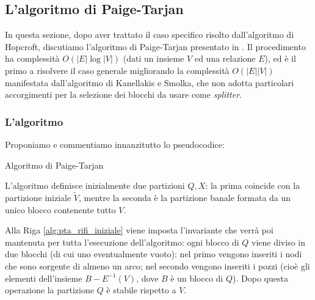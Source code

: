 \subsection{L'algoritmo di Paige-Tarjan}
In questa sezione, dopo aver trattato il caso specifico risolto dall'algoritmo di Hopcroft, discutiamo l'algoritmo di Paige-Tarjan presentato in \cite{paigetarjan}. Il procedimento ha complessità $O(|E|\log |V|)$ (dati un insieme $V$ ed una relazione $E$), ed è il primo a risolvere il caso generale migliorando la complessità $O(|E||V|)$ manifestata dall'algoritmo di Kanellakis e Smolka, che non adotta particolari accorgimenti per la selezione dei blocchi da usare come \emph{splitter}.

\subsubsection{L'algoritmo}
Proponiamo e commentiamo innanzitutto lo pseudocodice:\\
\begin{algorithm}[H]
    \label{alg:pt}
    \caption{Algoritmo di Paige-Tarjan}
\end{algorithm}

L'algoritmo definisce inizialmente due partizioni $Q,X$: la prima coincide con la partizione iniziale $\widetilde{V}$, mentre la seconda è la partizione banale formata da un unico blocco contenente tutto $V$.

Alla Riga \ref{alg:pta_rifi_iniziale} viene imposta l'invariante che verrà poi mantenuta per tutta l'esecuzione dell'algoritmo: ogni blocco di $Q$ viene diviso in due blocchi (di cui uno eventualmente vuoto): nel primo vengono inseriti i nodi che sono sorgente di almeno un arco; nel secondo vengono inseriti i pozzi (cioè gli elementi dell'insieme $B - E^{-1}(V)$, dove $B$ è un blocco di $Q$). Dopo questa operazione la partizione $Q$ è stabile rispetto a $V$.


